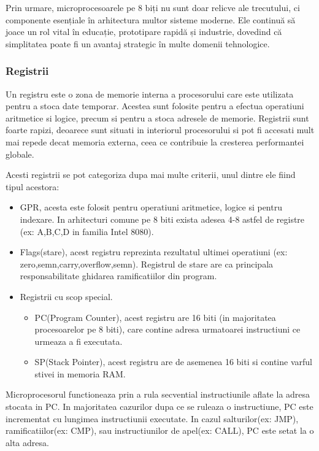 \documentclass[titlepage,12pt]{article}
\begin{document}
Prin urmare, microprocesoarele pe 8 biți nu sunt doar relicve ale trecutului, ci componente esențiale în arhitectura multor sisteme moderne. Ele continuă să joace un rol vital în educație, prototipare rapidă și industrie, dovedind că simplitatea poate fi un avantaj strategic în multe domenii tehnologice.

\subsubsection{Registrii}

Un registru este o zona de memorie interna a procesorului care este utilizata pentru a stoca date temporar. Acestea sunt folosite pentru a efectua operatiuni aritmetice si logice, precum si pentru a stoca adresele de memorie.
Registrii sunt foarte rapizi, deoarece sunt situati in interiorul procesorului si pot fi accesati mult mai repede decat memoria externa, ceea ce contribuie la cresterea performantei globale.

Acesti registrii se pot categoriza dupa mai multe criterii, unul dintre ele fiind tipul acestora:
\begin{itemize}
    
    \item \ac {GPR}, acesta este folosit pentru operatiuni aritmetice, logice si pentru indexare. In arhitecturi comune pe 8 biti exista adesea 4-8 astfel de registre (ex: A,B,C,D in familia Intel 8080).
    \item Flags(stare), acest registru reprezinta rezultatul ultimei operatiuni (ex: zero,semn,carry,overflow,semn). Registrul de stare are ca principala responsabilitate ghidarea ramificatiilor din program.
    \item Registrii cu scop special.
    \begin{itemize}
        \item PC(Program Counter), acest registru are 16 biti (in majoritatea procesoarelor pe 8 biti), care contine adresa urmatoarei instructiuni ce urmeaza a fi executata.
        \item SP(Stack Pointer), acest registru are de asemenea 16 biti si contine varful stivei in memoria RAM.
    \end{itemize}

\end{itemize}

Microprocesorul functioneaza prin a rula secvential instructiunile aflate la adresa stocata in PC.
In majoritatea cazurilor dupa ce se ruleaza o instructiune, PC este incrementat cu lungimea instructiunii executate.
In cazul salturilor(ex: JMP), ramificatiilor(ex: CMP), sau instructiunilor de apel(ex: CALL), PC este setat la o alta adresa.
\end{document}
